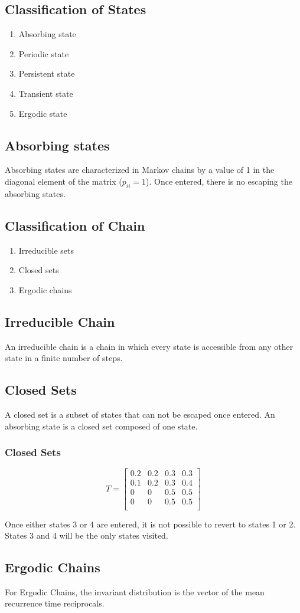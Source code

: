 \subsection{Classification of States}
\begin{enumerate}
	\item Absorbing state \item Periodic state \item Persistent state
	\item Transient state \item Ergodic state
\end{enumerate}


\subsection{Absorbing states}

Absorbing states are characterized in Markov chains by a value of
1 in the diagonal element of the matrix ($p_{ii} = 1$). Once
entered, there is no escaping the absorbing states.


\subsection{Classification of Chain}
\begin{enumerate}
	\item Irreducible sets \item Closed sets \item Ergodic chains
\end{enumerate}

\subsection{Irreducible Chain}
An irreducible chain is a chain in which every state is accessible
from any other state in a finite number of steps.

\subsection{Closed Sets}
A closed set is a subset of states that can not be escaped once
entered. An absorbing state is a closed set composed of one state.
\subsubsection{Closed Sets}
\[
T= \left[ \begin{array}{cccc} 0.2 & 0.2 & 0.3 & 0.3 \\ 0.1 & 0.2 & 0.3 & 0.4 \\0 & 0 & 0.5 & 0.5 \\0 & 0 & 0.5 & 0.5 \\
\end{array} \right]
\]

Once either states 3 or 4 are entered, it is not possible to
revert to states 1 or 2. States 3 and 4 will be the only states
visited.
\subsection{Ergodic Chains}
For Ergodic Chains, the invariant distribution is the vector of
the mean recurrence time reciprocals.

\newpage
